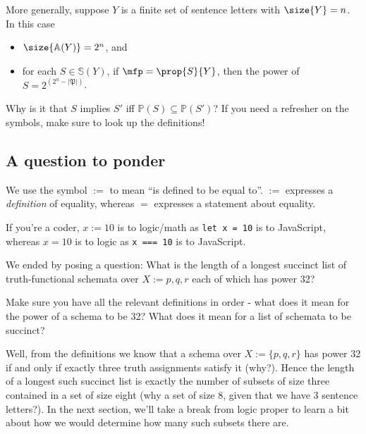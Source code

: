 More generally, suppose $Y$ is a finite set of sentence letters with $\size{Y}=n$. In this case
\begin{itemize}
\item $\size{\mathbb{A}(Y)}=2^n$, and 
\item for each $S\in\mathbb{S}(Y)$, if $\mfp=\prop{S}{Y}$, then the power of $S = 2^{(2^n-|\mathfrak{P}|)}$.
\end{itemize}

\begin{aside}
    Why is it that $S$ implies $S'$ iff $\mathbb{P}(S) \subseteq \mathbb{P}(S')$? If you need a refresher on the symbols, make sure to look up the definitions!
\end{aside}

\subsection{A question to ponder}
\begin{definition}
    We use the symbol $:=$ to mean ``is defined to be equal to''. $:=$ expresses a \emph{definition} of equality, whereas $=$ expresses a statement about equality.

    If you're a coder, $x := 10$ is to logic/math as \verb|let x = 10| is to JavaScript, whereas $x = 10$ is to logic as \verb|x === 10| is to JavaScript.
\end{definition}

We ended by posing a question:
What is the length of a longest succinct list of truth-functional schemata over $X := {p, q, r}$ each of which has power 32?

\begin{aside}
    Make sure you have all the relevant definitions in order - what does it mean for the power of a schema to be 32? What does it mean for a list of schemata to be succinct?  
\end{aside}

Well, from the definitions we know that a schema over $X := \{p, q, r\}$ has power 32 if and only if exactly three truth assignments satisfy it (why?). Hence the length of a longest such succinct list is exactly the number of subsets of size three contained in a set of size eight (why a set of size 8, given that we have 3 sentence letters?). In the next section, we'll take a break from logic proper to learn a bit about how we would determine how many such subsets there are. 

